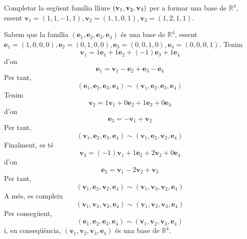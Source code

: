 \begin{exemple}
Completar la següent família lliure $(\mathbf{v}_{1},\mathbf{v}_{2},\mathbf{%
v}_{3})$ per a formar una base de $\mathbb{R}^{4}$, essent $\mathbf{v}%
_{1}=(1,1,-1,1),\mathbf{v}_{2}=(1,1,0,1),\mathbf{v}_{3}=(1,2,1,1)$.

\end{exemple}
\begin{solucio}
Sabem que la família $(\mathbf{e}_{1},\mathbf{e}_{2},\mathbf{e}_{3},%
\mathbf{e}_{4})$ és una base de $\mathbb{R}^{4}$, essent $\mathbf{e}%
_{1}=(1,0,0,0),\mathbf{e}_{2}=(0,1,0,0),\mathbf{e}_{3}=(0,0,1,0),\mathbf{e}%
_{4}=(0,0,0,1)$. Tenim%
\begin{equation*}
\mathbf{v}_{1}=1\mathbf{e}_{1}+1\mathbf{e}_{2}+(-1)\mathbf{e}_{3}+1\mathbf{e}%
_{4}
\end{equation*}%
d’on%
\begin{equation*}
\mathbf{e}_{1}=\mathbf{v}_{1}-\mathbf{e}_{2}+\mathbf{e}_{3}-\mathbf{e}_{4}
\end{equation*}%
Per tant,%
\begin{equation*}
(\mathbf{e}_{1},\mathbf{e}_{2},\mathbf{e}_{3},\mathbf{e}_{4})\sim (\mathbf{v}%
_{1},\mathbf{e}_{2},\mathbf{e}_{3},\mathbf{e}_{4})
\end{equation*}%
Tenim%
\begin{equation*}
\mathbf{v}_{2}=1\mathbf{v}_{1}+0\mathbf{e}_{2}+1\mathbf{e}_{3}+0\mathbf{e}%
_{4}
\end{equation*}%
d’on%
\begin{equation*}
\mathbf{e}_{3}=-\mathbf{v}_{1}+\mathbf{v}_{2}
\end{equation*}%
Per tant,%
\begin{equation*}
(\mathbf{v}_{1},\mathbf{e}_{2},\mathbf{e}_{3},\mathbf{e}_{4})\sim (\mathbf{v}%
_{1},\mathbf{e}_{2},\mathbf{v}_{2},\mathbf{e}_{4})
\end{equation*}%
Finalment, es té%
\begin{equation*}
\mathbf{v}_{3}=(-1)\mathbf{v}_{1}+1\mathbf{e}_{2}+2\mathbf{v}_{2}+0\mathbf{e}%
_{4}
\end{equation*}%
d’on%
\begin{equation*}
\mathbf{e}_{2}=\mathbf{v}_{1}-2\mathbf{v}_{2}+\mathbf{v}_{3}
\end{equation*}%
Per tant,%
\begin{equation*}
(\mathbf{v}_{1},\mathbf{e}_{2},\mathbf{v}_{2},\mathbf{e}_{4})\sim (\mathbf{v}%
_{1},\mathbf{v}_{3},\mathbf{v}_{2},\mathbf{e}_{4})
\end{equation*}%
A més, es compleix%
\begin{equation*}
(\mathbf{v}_{1},\mathbf{v}_{3},\mathbf{v}_{2},\mathbf{e}_{4})\sim (\mathbf{v}%
_{1},\mathbf{v}_{2},\mathbf{v}_{3},\mathbf{e}_{4})
\end{equation*}%
Per consegüent, 
\begin{equation*}
(\mathbf{e}_{1},\mathbf{e}_{2},\mathbf{e}_{3},\mathbf{e}_{4})\sim (\mathbf{v}%
_{1},\mathbf{v}_{2},\mathbf{v}_{3},\mathbf{e}_{4})
\end{equation*}%
i, en conseqüència, $(\mathbf{v}_{1},\mathbf{v}_{2},\mathbf{v}_{3},\mathbf{e}%
_{4})$ és una base de $\mathbb{R}^{4}$.
\end{solucio}


